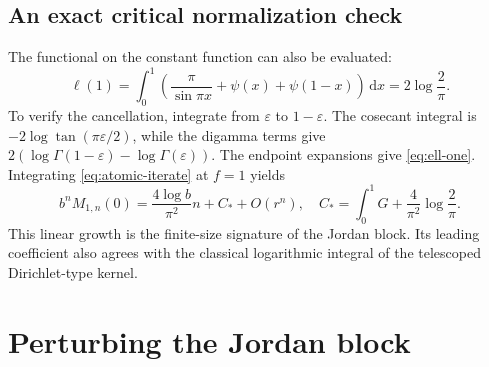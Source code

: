 \documentclass[11pt,a4paper]{article}
\numberwithin{equation}{section}
\theoremstyle{definition}
\theoremstyle{remark}
\newcommand{\dd}{\,\mathrm d}
\begin{document}
\subsection{An exact critical normalization check}
The functional on the constant function can also be evaluated:
\begin{equation}
 \ell(1)=\int_0^1\left(
 \frac{\pi}{\sin\pi x}+\psi(x)+\psi(1-x)\right)\dd x
 =2\log\frac2\pi.
 \label{eq:ell-one}
\end{equation}
To verify the cancellation, integrate from $\varepsilon$ to
$1-\varepsilon$. The cosecant integral is
$-2\log\tan(\pi\varepsilon/2)$, while the digamma terms give
$2(\log\Gamma(1-\varepsilon)-\log\Gamma(\varepsilon))$.
The endpoint expansions give \cref{eq:ell-one}.
Integrating \cref{eq:atomic-iterate} at $f=1$ yields
\begin{equation}
 b^nM_{1,n}(0)=\frac{4\log b}{\pi^2}n+C_*+O(r^n),
 \quad
 C_*=\int_0^1G+\frac4{\pi^2}\log\frac2\pi.
 \label{eq:critical-atomic-moment}
\end{equation}
This linear growth is the finite-size signature of the Jordan block.
Its leading coefficient also agrees with the classical logarithmic
integral of the telescoped Dirichlet-type kernel.

\section{Perturbing the Jordan block}
\label{sec:perturbation}
\end{document}
